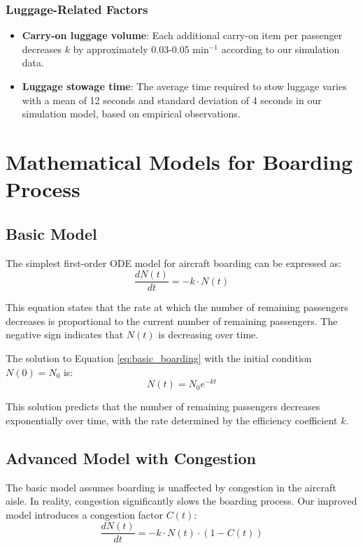 \documentclass[12pt,a4paper]{article}
\begin{document}
\subsubsection{Luggage-Related Factors}
\begin{itemize}
\item \textbf{Carry-on luggage volume}: Each additional carry-on item per passenger decreases $k$ by approximately 0.03-0.05 min$^{-1}$ according to our simulation data.

\item \textbf{Luggage stowage time}: The average time required to stow luggage varies with a mean of 12 seconds and standard deviation of 4 seconds in our simulation model, based on empirical observations.
\end{itemize}

\section{Mathematical Models for Boarding Process}

\subsection{Basic Model}
The simplest first-order ODE model for aircraft boarding can be expressed as:
\begin{equation}
\frac{dN(t)}{dt} = -k \cdot N(t)
\label{eq:basic_boarding}
\end{equation}

This equation states that the rate at which the number of remaining passengers decreases is proportional to the current number of remaining passengers. The negative sign indicates that $N(t)$ is decreasing over time.

The solution to Equation \ref{eq:basic_boarding} with the initial condition $N(0) = N_0$ is:
\begin{equation}
N(t) = N_0 e^{-kt}
\label{eq:basic_solution}
\end{equation}

This solution predicts that the number of remaining passengers decreases exponentially over time, with the rate determined by the efficiency coefficient $k$.

\subsection{Advanced Model with Congestion}
The basic model assumes boarding is unaffected by congestion in the aircraft aisle. In reality, congestion significantly slows the boarding process. Our improved model introduces a congestion factor $C(t)$:
\begin{equation}
\frac{dN(t)}{dt} = -k \cdot N(t) \cdot (1 - C(t))
\label{eq:advanced_boarding}
\end{equation}
\end{document}
